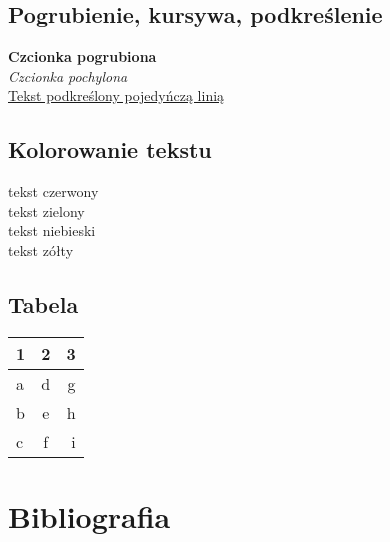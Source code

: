 \documentclass[a4paper,12pt]{article}
\begin{document}
\subsection{Pogrubienie, kursywa, podkreślenie}
\large \textbf{Czcionka pogrubiona} \\
\textit{Czcionka pochylona}\\ 
\uline{Tekst podkreślony pojedyńczą linią}\\

\subsection{ Kolorowanie tekstu}
{\color{red}  tekst czerwony} \\
{\color{green} tekst zielony}\\
{\color{blue}  tekst niebieski}\\
{\color{yellow} tekst zółty}
\subsection{Tabela}
\begin{table}[h!]
  \begin{center}
    \label{tab:table1}
    \begin{tabular}{l|c|r}
      \textbf{1} & \textbf{2} & \textbf{3}\\
      \hline
      a & d & g\\
      b & e & h\\
      c & f & i\\
    \end{tabular}
  \end{center}
\end{table}
\section{Bibliografia} \cite{1, 2, 3}

{}
\end{document}
